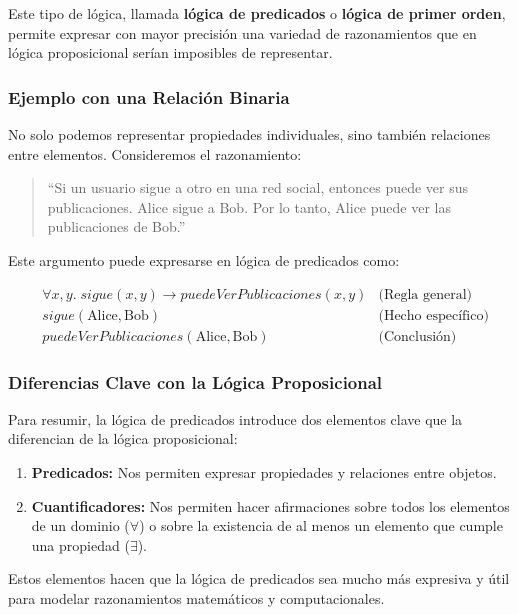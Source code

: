 Este tipo de lógica, llamada \textbf{lógica de predicados} o \textbf{lógica de primer orden}, permite expresar con mayor precisión una variedad de razonamientos que en lógica proposicional serían imposibles de representar.

\subsubsection{Ejemplo con una Relación Binaria}
No solo podemos representar propiedades individuales, sino también relaciones entre elementos. Consideremos el razonamiento:

\begin{quote}
    ``Si un usuario sigue a otro en una red social, entonces puede ver sus publicaciones. Alice sigue a Bob. Por lo tanto, Alice puede ver las publicaciones de Bob.''
\end{quote}

Este argumento puede expresarse en lógica de predicados como:

\begin{align*}
    &\forall x, y. \; \mathit{sigue}(x, y) \rightarrow \mathit{puedeVerPublicaciones}(x, y)  &\text{(Regla general)} \\
    &\mathit{sigue}(\text{Alice}, \text{Bob})  &\text{(Hecho específico)} \\
    &\mathit{puedeVerPublicaciones}(\text{Alice}, \text{Bob})  &\text{(Conclusión)}
\end{align*}

\subsubsection{Diferencias Clave con la Lógica Proposicional}
Para resumir, la lógica de predicados introduce dos elementos clave que la diferencian de la lógica proposicional:

\begin{enumerate}
    \item \textbf{Predicados:} Nos permiten expresar propiedades y relaciones entre objetos.
    \item \textbf{Cuantificadores:} Nos permiten hacer afirmaciones sobre todos los elementos de un dominio (\(\forall\)) o sobre la existencia de al menos un elemento que cumple una propiedad (\(\exists\)).
\end{enumerate}

Estos elementos hacen que la lógica de predicados sea mucho más expresiva y útil para modelar razonamientos matemáticos y computacionales.


